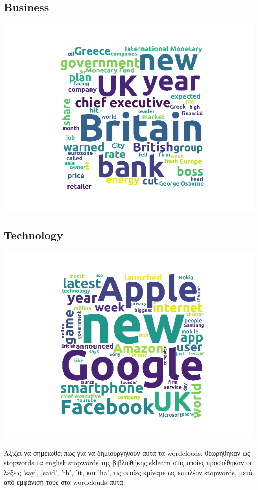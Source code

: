 \documentclass{article}
\begin{document}
\subsection*{\textlatin{Business}}
\includegraphics[scale=0.6]{Busi}
\subsection*{\textlatin{Technology}}
\includegraphics[scale=0.6]{Techno}

Αξίζει να σημειωθεί πως για να δημιουργηθούν αυτά τα \textlatin{wordclouds}, θεωρήθηκαν ως \textlatin{stopwords} 
τα \textlatin{english stopwords} της βιβλιοθήκης \textlatin{sklearn}
στις οποίες προστέθηκαν οι λέξεις \textlatin{'say', 'said', 'th', 'it,} και \textlatin{'ha'}, τις οποίες κρίναμε ως επιπλέον 
\textlatin{stopwords}, μετά από εμφάνισή τους στα \textlatin{wordclouds} αυτά. 
\end{document}
